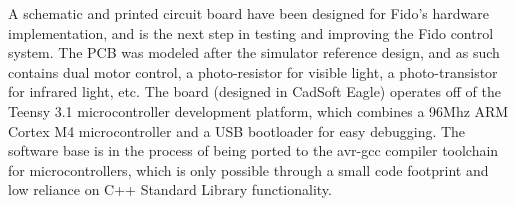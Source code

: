 A schematic and printed circuit board have been designed for Fido's hardware implementation, and is the next step in testing and improving the Fido control system.  The PCB was modeled after the simulator reference design, and as such contains dual motor control, a photo-resistor for visible light, a photo-transistor for infrared light, etc.  The board (designed in CadSoft Eagle) operates off of the Teensy 3.1 microcontroller development platform, which combines a 96Mhz ARM Cortex M4 microcontroller and a USB bootloader for easy debugging.  The software base is in the process of being ported to the avr-gcc compiler toolchain for microcontrollers, which is only possible through a small code footprint and low reliance on C++ Standard Library functionality.